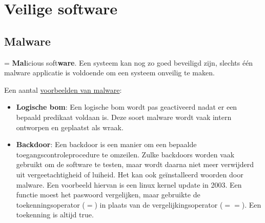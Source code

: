 \documentclass{report}
\begin{document}
	\section{Veilige software}
	\subsection{Malware}
	= \textbf{Mal}icious soft\textbf{ware}. Een systeem kan nog zo goed beveiligd zijn, slechts één malware applicatie is voldoende om een systeem onveilig te maken.

	Een aantal \underline{voorbeelden van malware}:
	\begin{itemize}
		\item \textbf{Logische bom}: Een logische bom wordt pas geactiveerd nadat er een bepaald predikaat voldaan is. Deze soort malware wordt vaak intern ontworpen en geplaatst als wraak.
		\item \textbf{Backdoor}: Een backdoor is een manier om een bepaalde toegangscontroleprocedure te omzeilen. Zulke backdoors worden vaak gebruikt om de software te testen, maar wordt daarna niet meer verwijderd uit vergeetachtigheid of luiheid. Het kan ook geïnstalleerd woorden door malware. Een voorbeeld hiervan is een linux kernel update in 2003. Een functie moest het paswoord vergelijken, maar gebruikte de toekenningsoperator ($=$)  in plaats van de vergelijkingsoperator ($==$). Een toekenning is altijd true.
		

\end{itemize}
\end{document}
